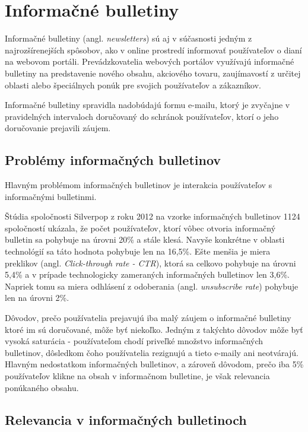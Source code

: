 
\newpage
\chapter{Informačné bulletiny}

Informačné bulletiny (angl. \emph{newsletters}) sú aj v súčasnosti jedným z najrozšírenejších spôsobov, ako v online
prostredí informovať používateľov o dianí na webovom portáli. Prevádzkovatelia webových portálov využívajú informačné
bulletiny na predstavenie nového obsahu, akciového tovaru, zaujímavostí z určitej oblasti alebo špeciálnych ponúk pre
svojich používateľov a zákazníkov.

Informačné bulletiny spravidla nadobúdajú formu e-mailu, ktorý je zvyčajne v pravidelných intervaloch doručovaný
do schránok používateľov, ktorí o jeho doručovanie prejavili záujem.


\section{Problémy informačných bulletinov}
Hlavným problémom informačných bulletinov je interakcia používateľov s informačnými bulletinmi.

Štúdia spoločnosti Silverpop z roku 2012\cite{mailmarketing} na vzorke informačných bulletinov 1124 spoločností ukázala,
že počet používateľov, ktorí vôbec otvoria informačný bulletin sa pohybuje na úrovni 20\% a stále klesá. Navyše konkrétne
v oblasti technológií sa táto hodnota pohybuje len na 16,5\%. Ešte menšia je miera preklikov
(angl. \emph{Click-through rate - CTR}), ktorá sa celkovo pohybuje na úrovni 5,4\% a v prípade technologicky zameraných
informačných bulletinov len 3,6\%. Napriek tomu sa miera odhlásení z odoberania (angl. \emph{unsubscribe rate}) pohybuje
len na úrovni 2\%.

Dôvodov, prečo používatelia prejavujú iba malý záujem o informačné bulletiny ktoré im sú doručované, môže byť niekoľko.
Jedným z takýchto dôvodov môže byť vysoká saturácia - používateľom chodí priveľké množstvo informačných bulletinov,
dôsledkom čoho používatelia rezignujú a tieto e-maily ani neotvárajú.
Hlavným nedostatkom informačných bulletinov, a zároveň dôvodom, prečo iba 5\% používateľov klikne na obsah v informačnom
bulletine, je však relevancia ponúkaného obsahu.


\section{Relevancia v informačných bulletinoch}

